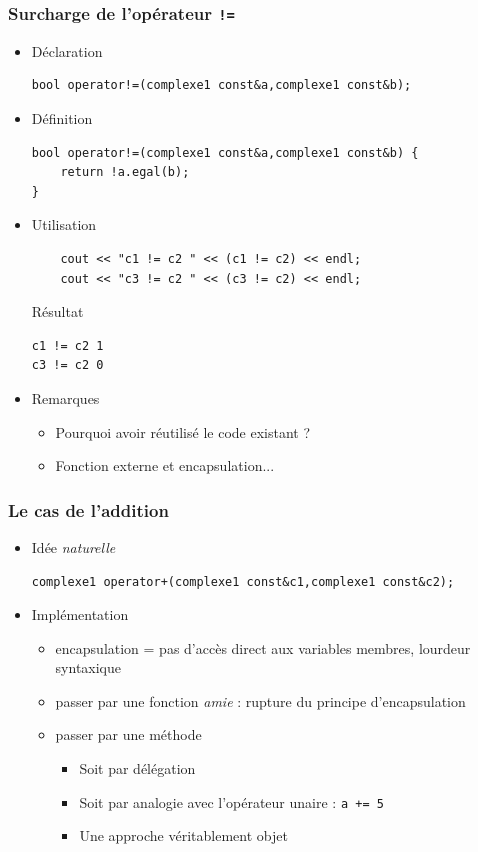 \begin{frame}[fragile]\frametitle{Surcharge de l'opérateur \texttt{!=}}
\begin{itemize}
\item Déclaration
\begin{lstlisting}
bool operator!=(complexe1 const&a,complexe1 const&b);
\end{lstlisting}
\item Définition
\begin{lstlisting}
bool operator!=(complexe1 const&a,complexe1 const&b) {
    return !a.egal(b);
}
\end{lstlisting}
\item Utilisation
\begin{lstlisting}
    cout << "c1 != c2 " << (c1 != c2) << endl;
    cout << "c3 != c2 " << (c3 != c2) << endl;
\end{lstlisting}
\begin{block}{Résultat}
{\tiny
\begin{verbatim}
c1 != c2 1
c3 != c2 0
\end{verbatim}
}
\end{block}
\item Remarques
\begin{itemize}
\item Pourquoi avoir réutilisé le code existant ?
\item Fonction externe et encapsulation...
\end{itemize}
\end{itemize}
\end{frame}

\begin{frame}[fragile]\frametitle{Le cas de l'addition}
\begin{itemize}
\item Idée \textit{naturelle}
\begin{lstlisting}
complexe1 operator+(complexe1 const&c1,complexe1 const&c2);
\end{lstlisting}
\item Implémentation
\begin{itemize}
\item encapsulation = pas d'accès direct aux variables membres, lourdeur syntaxique
\item passer par une fonction \textit{amie} : rupture du principe d'encapsulation
\item passer par une méthode
\begin{itemize}
\item Soit par délégation
\item Soit par analogie avec l'opérateur unaire : \texttt{a += 5}
\item Une approche véritablement objet
\end{itemize}
\end{itemize}
\end{itemize}
\end{frame}

